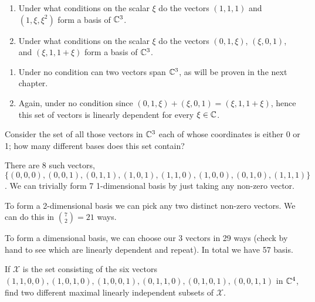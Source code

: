 \begin{problem}
  \begin{enumerate}[label=(\alph*)]
    \item Under what conditions on the scalar $\xi$ do the vectors $(1, 1, 1)$ and $(1, \xi, \xi^2)$ form a basis of $\mathbb{C}^3$.
    \item Under what conditions on the scalar $\xi$ do the vectors $(0, 1, \xi)$, $(\xi, 0, 1)$, and $(\xi, 1, 1 + \xi)$ form a basis of $\mathbb{C}^3$.
  \end{enumerate}
\end{problem}

\begin{solution}
  \begin{enumerate}[label=(\alph*)]
    \item Under no condition can two vectors span $\mathbb{C}^3$, as will be proven in the next chapter.
    \item Again, under no condition since $(0, 1, \xi) + (\xi, 0, 1) = (\xi, 1, 1 + \xi)$, hence this set of vectors is linearly dependent for every $\xi \in \mathbb{C}$.
  \end{enumerate}
\end{solution}

\begin{problem}
  Consider the set of all those vectors in $\mathbb{C}^3$ each of whose coordinates is either 0 or 1; how many different bases does this set contain?
\end{problem}

\begin{solution}
  There are 8 such vectors, $\{(0, 0, 0), (0, 0, 1), (0, 1, 1), (1, 0, 1), (1, 1, 0), (1, 0, 0), (0, 1, 0), (1, 1, 1)\}$.
  We can trivially form 7 1-dimensional basis by just taking any non-zero vector.

  To form a 2-dimensional basis we can pick any two distinct non-zero vectors.
  We can do this in $\binom{7}{2} = 21$ ways.

  To form a dimensional basis, we can choose our 3 vectors in 29 ways (check by hand to see which are linearly dependent and repeat).
  In total we have 57 basis.
\end{solution}

\begin{problem}
  If $\mathcal{X}$ is the set consisting of the six vectors $(1, 1, 0, 0), (1, 0, 1, 0), (1, 0, 0, 1), (0, 1, 1, 0), (0, 1, 0, 1), (0, 0, 1, 1)$ in $\mathbb{C}^4$, find two different maximal linearly independent subsets of $\mathcal{X}$.
\end{problem}


